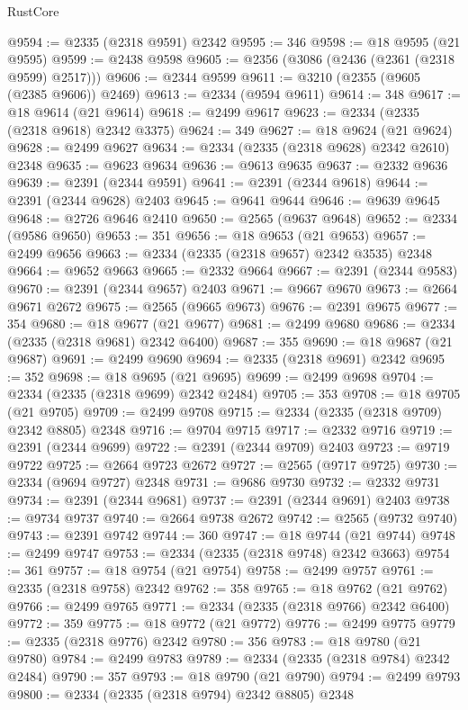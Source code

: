 \begin{lexlean}{RustCore}
\begin{coremodule}
@9594 := @2335 (@2318 @9591) @2342
@9595 := 346
@9598 := @18 @9595 (@21 @9595)
@9599 := @2438 @9598
@9605 := @2356 (@3086 (@2436 (@2361 (@2318 @9599) @2517)))
@9606 := @2344 @9599
@9611 := @3210 (@2355 (@9605 (@2385 @9606)) @2469)
@9613 := @2334 (@9594 @9611)
@9614 := 348
@9617 := @18 @9614 (@21 @9614)
@9618 := @2499 @9617
@9623 := @2334 (@2335 (@2318 @9618) @2342 @3375)
@9624 := 349
@9627 := @18 @9624 (@21 @9624)
@9628 := @2499 @9627
@9634 := @2334 (@2335 (@2318 @9628) @2342 @2610) @2348
@9635 := @9623 @9634
@9636 := @9613 @9635
@9637 := @2332 @9636
@9639 := @2391 (@2344 @9591)
@9641 := @2391 (@2344 @9618)
@9644 := @2391 (@2344 @9628) @2403
@9645 := @9641 @9644
@9646 := @9639 @9645
@9648 := @2726 @9646 @2410
@9650 := @2565 (@9637 @9648)
@9652 := @2334 (@9586 @9650)
@9653 := 351
@9656 := @18 @9653 (@21 @9653)
@9657 := @2499 @9656
@9663 := @2334 (@2335 (@2318 @9657) @2342 @3535) @2348
@9664 := @9652 @9663
@9665 := @2332 @9664
@9667 := @2391 (@2344 @9583)
@9670 := @2391 (@2344 @9657) @2403
@9671 := @9667 @9670
@9673 := @2664 @9671 @2672
@9675 := @2565 (@9665 @9673)
@9676 := @2391 @9675
@9677 := 354
@9680 := @18 @9677 (@21 @9677)
@9681 := @2499 @9680
@9686 := @2334 (@2335 (@2318 @9681) @2342 @6400)
@9687 := 355
@9690 := @18 @9687 (@21 @9687)
@9691 := @2499 @9690
@9694 := @2335 (@2318 @9691) @2342
@9695 := 352
@9698 := @18 @9695 (@21 @9695)
@9699 := @2499 @9698
@9704 := @2334 (@2335 (@2318 @9699) @2342 @2484)
@9705 := 353
@9708 := @18 @9705 (@21 @9705)
@9709 := @2499 @9708
@9715 := @2334 (@2335 (@2318 @9709) @2342 @8805) @2348
@9716 := @9704 @9715
@9717 := @2332 @9716
@9719 := @2391 (@2344 @9699)
@9722 := @2391 (@2344 @9709) @2403
@9723 := @9719 @9722
@9725 := @2664 @9723 @2672
@9727 := @2565 (@9717 @9725)
@9730 := @2334 (@9694 @9727) @2348
@9731 := @9686 @9730
@9732 := @2332 @9731
@9734 := @2391 (@2344 @9681)
@9737 := @2391 (@2344 @9691) @2403
@9738 := @9734 @9737
@9740 := @2664 @9738 @2672
@9742 := @2565 (@9732 @9740)
@9743 := @2391 @9742
@9744 := 360
@9747 := @18 @9744 (@21 @9744)
@9748 := @2499 @9747
@9753 := @2334 (@2335 (@2318 @9748) @2342 @3663)
@9754 := 361
@9757 := @18 @9754 (@21 @9754)
@9758 := @2499 @9757
@9761 := @2335 (@2318 @9758) @2342
@9762 := 358
@9765 := @18 @9762 (@21 @9762)
@9766 := @2499 @9765
@9771 := @2334 (@2335 (@2318 @9766) @2342 @6400)
@9772 := 359
@9775 := @18 @9772 (@21 @9772)
@9776 := @2499 @9775
@9779 := @2335 (@2318 @9776) @2342
@9780 := 356
@9783 := @18 @9780 (@21 @9780)
@9784 := @2499 @9783
@9789 := @2334 (@2335 (@2318 @9784) @2342 @2484)
@9790 := 357
@9793 := @18 @9790 (@21 @9790)
@9794 := @2499 @9793
@9800 := @2334 (@2335 (@2318 @9794) @2342 @8805) @2348

\end{coremodule}
\end{lexlean}
